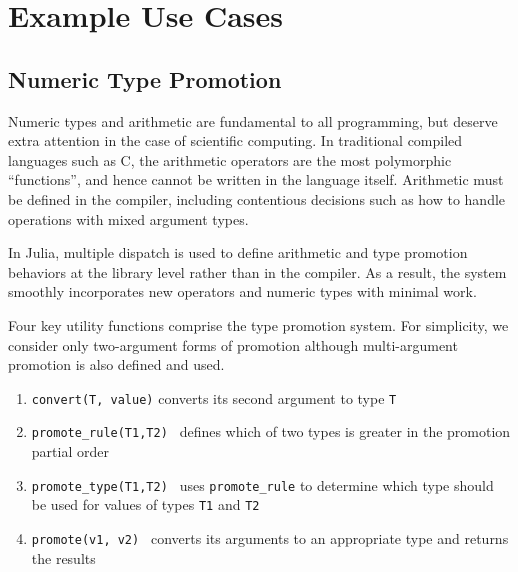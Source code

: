 \chapter{Example Use Cases}



\section{Numeric Type Promotion}

Numeric types and arithmetic are fundamental to all programming, but deserve
extra attention in the case of scientific computing.
In traditional compiled languages such as C, the arithmetic operators are the
most polymorphic ``functions'', and hence cannot be written in the language
itself. Arithmetic must be defined in the compiler, including contentious
decisions such as how to handle operations with mixed argument types.

In Julia, multiple dispatch is used to define arithmetic and type
promotion behaviors at the library level rather than in the compiler.
As a result, the system smoothly incorporates new
operators and numeric types with minimal work.

Four key utility functions comprise the type promotion system.
For simplicity, we consider only two-argument forms of promotion
although multi-argument promotion is also defined and used.

\begin{enumerate}
\item {\tt convert(T, value)} converts its second argument to type {\tt T}
\item {\tt promote\_rule(T1,T2) } defines which of two types is greater in
the promotion partial order
\item {\tt promote\_type(T1,T2) } uses {\tt promote\_rule} to determine which
type should be used for values of types {\tt T1} and {\tt T2}
\item {\tt promote(v1, v2) } converts its arguments to an appropriate type
and returns the results
\end{enumerate}

